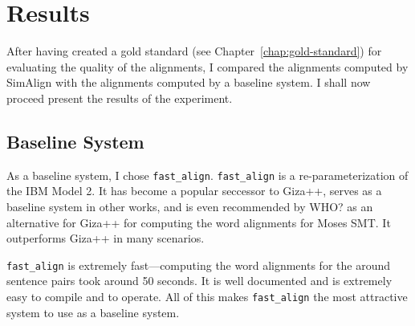 \chapter{Results}

After having created a gold standard (see Chapter~\ref{chap:gold-standard}) for evaluating the quality of the alignments, I compared the alignments computed by SimAlign with the alignments computed by a baseline system.
I shall now proceed present the results of the experiment.

\section{Baseline System}
As a baseline system, I chose \texttt{fast\_align}. 
\texttt{fast\_align} is a re-parameterization of the IBM Model 2. 
It has become a popular seccessor to Giza++, serves as a baseline system in other works, and is even recommended by WHO? as an alternative for Giza++ for computing the word alignments for Moses SMT. 
It outperforms Giza++ in many scenarios.

\texttt{fast\_align} is extremely fast---computing the word alignments for the around  sentence pairs took around 50 seconds. 
It is well documented and is extremely easy to compile and to operate. 
All of this makes \texttt{fast\_align} the most attractive system to use as a baseline system.

